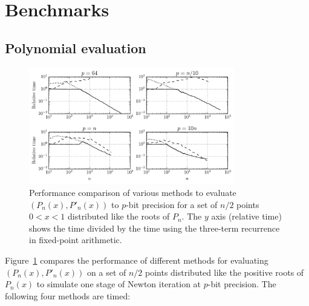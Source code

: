 \documentclass[11pt,a4paper]{article}
\begin{document}
\section{Benchmarks}

\label{sec:bench}

\subsection{Polynomial evaluation}

\begin{figure}[h!]
\begin{centering}
\includegraphics[width=0.8\textwidth]{benchplot}
\caption{Performance comparison of various methods to evaluate $(P_n(x), P'_n(x))$ to $p$-bit precision for a
set of $n / 2$ points $0 < x < 1$ distributed like the roots of $P_n$.
The $y$ axis (relative time) shows the time divided by the time
using the three-term recurrence in fixed-point arithmetic.}
\label{fig:benchplot}
\end{centering}
\end{figure}

Figure~\ref{fig:benchplot} compares the performance of different methods
for evaluating $(P_n(x), P'_n(x))$ on a set of $n/2$ points
distributed like the positive roots of $P_n(x)$
to simulate one stage of Newton iteration at $p$-bit precision.
The following four methods are timed:
\end{document}
